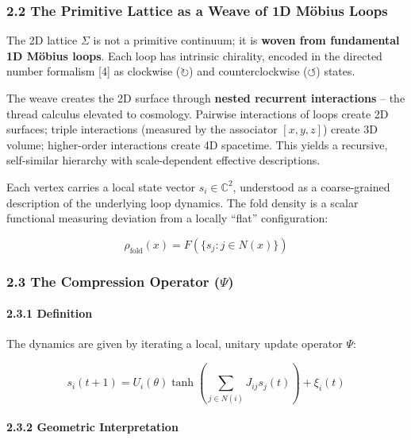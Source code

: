 \documentclass[
]{article}
\begin{document}
\subsubsection{2.2 The Primitive Lattice as a Weave of 1D Möbius
Loops}\label{the-primitive-lattice-as-a-weave-of-1d-muxf6bius-loops}

The 2D lattice \(\Sigma\) is not a primitive continuum; it is
\textbf{woven from fundamental 1D Möbius loops}. Each loop has intrinsic
chirality, encoded in the directed number formalism {[}4{]} as clockwise
(\(\circlearrowright\)) and counterclockwise (\(\circlearrowleft\))
states.

The weave creates the 2D surface through \textbf{nested recurrent
interactions} -- the thread calculus elevated to cosmology. Pairwise
interactions of loops create 2D surfaces; triple interactions (measured
by the associator \([x, y, z]\)) create 3D volume; higher-order
interactions create 4D spacetime. This yields a recursive, self-similar
hierarchy with scale-dependent effective descriptions.

Each vertex carries a local state vector \(s_i \in \mathbb{C}^2\),
understood as a coarse-grained description of the underlying loop
dynamics. The fold density is a scalar functional measuring deviation
from a locally ``flat'' configuration:

\[\rho_{\text{fold}}(x) = F(\{s_j : j \in N(x)\})\]

\subsubsection{\texorpdfstring{2.3 The Compression Operator
(\(\Psi\))}{2.3 The Compression Operator (\textbackslash Psi)}}\label{the-compression-operator-psi}

\paragraph{2.3.1 Definition}\label{definition}

The dynamics are given by iterating a local, unitary update operator
\(\Psi\):

\[s_i(t+1) = U_i(\theta) \tanh\left(\sum_{j \in N(i)} J_{ij} s_j(t)\right) + \xi_i(t)\]

\paragraph{2.3.2 Geometric
Interpretation}\label{geometric-interpretation}
\end{document}
